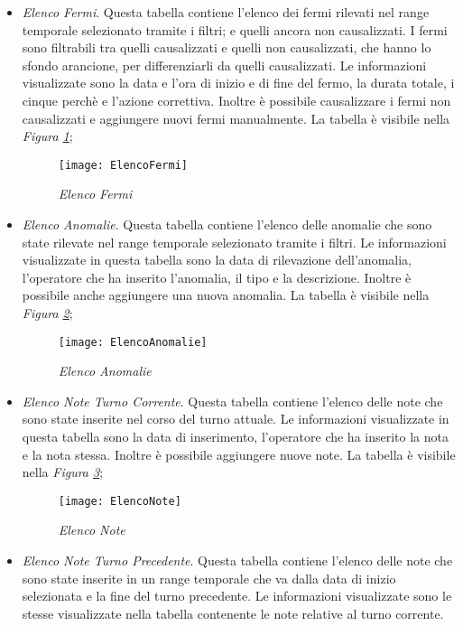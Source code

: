 \begin{itemize}
    \item \textit{Elenco Fermi}. Questa tabella contiene l'elenco dei fermi rilevati nel range temporale selezionato tramite i
    filtri; e quelli ancora non causalizzati. I fermi sono filtrabili tra quelli causalizzati e quelli non causalizzati,
    che hanno lo sfondo arancione, per differenziarli da quelli causalizzati. Le informazioni visualizzate sono la data
    e l'ora di inizio e di fine del fermo, la durata totale, i cinque perchè e l'azione correttiva. Inoltre è possibile
    causalizzare i fermi non causalizzati e aggiungere nuovi fermi manualmente. La tabella è visibile nella 
    \textit{Figura \ref{fig:ElencoFermi}};
    
    \begin{figure}[H]
      \texttt{[image: ElencoFermi]}
      \centering
      \caption{\textit{Elenco Fermi}}
      \label{fig:ElencoFermi}
    \end{figure}
    
    
    \item \textit{Elenco Anomalie}. Questa tabella contiene l'elenco delle anomalie che sono state rilevate  nel range
    temporale selezionato tramite i filtri. Le informazioni visualizzate in questa tabella sono la data di rilevazione
    dell'anomalia, l'operatore che ha inserito l'anomalia, il tipo e la descrizione. Inoltre è possibile anche aggiungere
    una nuova anomalia. La tabella è visibile nella \textit{Figura \ref{fig:ElencoAnomalie}};

    \begin{figure}[H]
      \texttt{[image: ElencoAnomalie]}
      \centering
      \caption{\textit{Elenco Anomalie}}
      \label{fig:ElencoAnomalie}
    \end{figure}

    \item \textit{Elenco Note Turno Corrente}. Questa tabella contiene l'elenco delle note che sono state inserite nel corso
    del turno attuale. Le informazioni visualizzate in questa tabella sono la data di inserimento, l'operatore che ha inserito
    la nota e la nota stessa. Inoltre è possibile aggiungere nuove note. La tabella è visibile nella 
    \textit{Figura \ref{fig:ElencoNote}};

    \begin{figure}[H]
      \texttt{[image: ElencoNote]}
      \centering
      \caption{\textit{Elenco Note}}
      \label{fig:ElencoNote}
    \end{figure}

    \item \textit{Elenco Note Turno Precedente}. Questa tabella contiene l'elenco delle note che sono state inserite in
    un range temporale che va dalla data di inizio selezionata e la fine del turno precedente. Le informazioni visualizzate sono
    le stesse visualizzate nella tabella contenente le note relative al turno corrente.
  \end{itemize}

